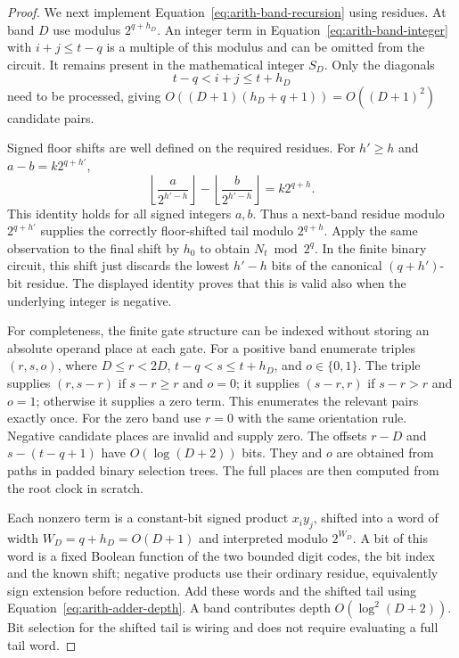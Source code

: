 \begin{proof}
We next implement Equation~\eqref{eq:arith-band-recursion} using
residues.  At band $D$ use modulus $2^{q+h_D}$.  An integer term
in Equation~\eqref{eq:arith-band-integer} with $i+j\leq t-q$
is a multiple of this modulus and can be omitted from the circuit.
It remains present in the mathematical integer $S_D$.
Only the diagonals
\begin{equation}
 t-q<i+j\leq t+h_D
 \label{eq:arith-relevant-diagonals}
\end{equation}
need to be processed, giving
$O((D+1)(h_D+q+1))=O((D+1)^2)$ candidate pairs.

Signed floor shifts are well defined on the required residues.
For $h'\geq h$ and $a-b=k2^{q+h'}$,
\begin{equation}
 \left\lfloor\frac{a}{2^{h'-h}}\right\rfloor
 -\left\lfloor\frac{b}{2^{h'-h}}\right\rfloor
       =k2^{q+h}.
 \label{eq:arith-signed-residue-floor}
\end{equation}
This identity holds for all signed integers $a,b$.  Thus a next-band
residue modulo $2^{q+h'}$ supplies the correctly floor-shifted
tail modulo $2^{q+h}$.  Apply the same observation to the final
shift by $h_0$ to obtain $N_t\bmod2^q$.
In the finite binary circuit, this shift just discards the lowest
$h'-h$ bits of the canonical $(q+h')$-bit residue.  The displayed
identity proves that this is valid also when the underlying integer
is negative.

For completeness, the finite gate structure can be indexed without
storing an absolute operand place at each gate.  For a positive
band enumerate triples $(r,s,o)$, where
$D\leq r<2D$, $t-q<s\leq t+h_D$, and $o\in\{0,1\}$.
The triple supplies $(r,s-r)$ if $s-r\geq r$ and $o=0$;
it supplies $(s-r,r)$ if $s-r>r$ and $o=1$; otherwise it supplies
a zero term.  This enumerates the relevant pairs exactly once.
For the zero band use $r=0$ with the same orientation rule.
Negative candidate places are invalid and supply zero.
The offsets $r-D$ and $s-(t-q+1)$ have $O(\log(D+2))$ bits.
They and $o$ are obtained from paths in padded binary selection trees.
The full places are then computed from the root clock in scratch.

Each nonzero term is a constant-bit signed product $x_i y_j$,
shifted into a word of width $W_D=q+h_D=O(D+1)$ and interpreted
modulo $2^{W_D}$.  A bit of this word is a fixed Boolean function
of the two bounded digit codes, the bit index and the known shift;
negative products use their ordinary residue, equivalently sign
extension before reduction.  Add these words and the shifted tail
using Equation~\eqref{eq:arith-adder-depth}.  A band contributes
depth $O(\log^2(D+2))$.  Bit selection for the shifted tail is
wiring and does not require evaluating a full tail word.


\end{proof}
